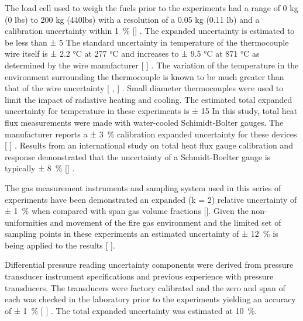 \documentclass[12pt,oneside]{book}
\begin{document}
The load cell used to weigh the fuels prior to the experiments had a range of 0 kg (0 lbs) to 200 kg (440lbs) with a resolution of a 0.05 kg (0.11 lb) and a calibration uncertainty within 1~\% [] . The expanded uncertainty is estimated to be less than  ± 5 %
The standard uncertainty in temperature of the thermocouple wire itself is  ± 2.2 °C at 277 °C and increases to ± 9.5 °C at 871 °C as determined by the wire manufacturer [ ] .  The variation of the temperature in the environment surrounding the thermocouple is known to be much greater than that of the wire uncertainty [ ,  ] .  Small diameter thermocouples were used to limit the impact of radiative heating and cooling.  The estimated total expanded uncertainty for temperature in these experiments is ± 15 %
In this study, total heat flux measurements were made with water-cooled Schimidt-Bolter gauges.  The manufacturer reports a ± 3~\% calibration expanded uncertainty for these devices [ ] . Results from an international study on total heat flux gauge calibration and response demonstrated that the uncertainty of a Schmidt-Boelter gauge is typically ± 8~\% [] .    

The gas measurement instruments and sampling system used in this series of experiments have been demonstrated an expanded (k = 2) relative uncertainty of ± 1~\% when compared with span gas volume fractions [].   Given the non-uniformities and movement of the fire gas environment and the limited set of sampling points in these experiments an estimated uncertainty of ± 12~\% is being applied to the results [ ]. 

Differential pressure reading uncertainty components were derived from pressure transducer
instrument specifications and previous experience with pressure transducers. The transducers
were factory calibrated and the zero and span of each was checked in the laboratory prior to the
experiments yielding an accuracy of ± 1~\% [ ] . The total expanded uncertainty was estimated at 10~\%.
\end{document}
